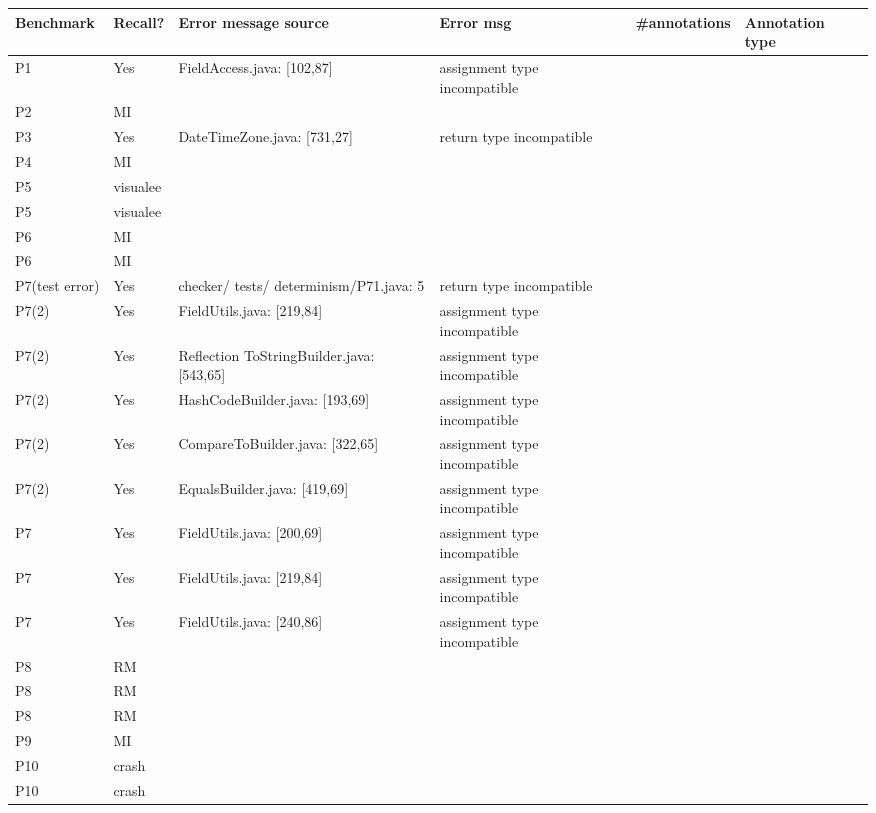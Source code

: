 \begin{table}[]
    \begin{tabular}{|p{1.5cm}|p{1cm}|p{3cm}|p{4cm}|p{2cm}|p{1.5cm}|}
        \hline
        Benchmark & Recall? & Error message source & Error msg & \#annotations & Annotation type  \\ \hline
        P1 & Yes & FieldAccess.java: [102,87] & assignment type incompatible &  &   \\
        P2 & MI &  &  &  &  \\
        P3 & Yes & DateTimeZone.java: [731,27] &  return type incompatible&  &  \\ 
        P4 & MI &  &  &  &  \\ 
        P5 & visualee &  &  &  &  \\ 
        P5 & visualee &  &  &  &  \\ 
        P6 & MI &  &  &  &  \\ 
        P6 & MI &  &  &  &  \\
        P7(test error) & Yes & checker/ tests/ determinism/P71.java: 5 & return type incompatible &  &  \\ 
        P7(2) & Yes & FieldUtils.java: [219,84] & assignment type incompatible &  &  \\
        P7(2) & Yes & Reflection ToStringBuilder.java: [543,65]  & assignment type incompatible &  &  \\
        P7(2) & Yes & HashCodeBuilder.java: [193,69]  & assignment type incompatible &  &  \\
        P7(2) & Yes & CompareToBuilder.java: [322,65] & assignment type incompatible &  &  \\
        P7(2) & Yes & EqualsBuilder.java: [419,69]  & assignment type incompatible &  &  \\
        P7 & Yes & FieldUtils.java: [200,69] & assignment type incompatible & &  \\
        P7 & Yes & FieldUtils.java: [219,84] & assignment type incompatible &  &  \\
        P7 & Yes & FieldUtils.java: [240,86] & assignment type incompatible &  &  \\
        P8 & RM &  &  &  &  \\
        P8 & RM &  &  &  &  \\
        P8 & RM &  &  &  &  \\
        P9 & MI &  &  &  &  \\
        P10 & crash &  &  &  &  \\
        P10 & crash &  &  &  &  \\

\end{tabular}
\end{table}
